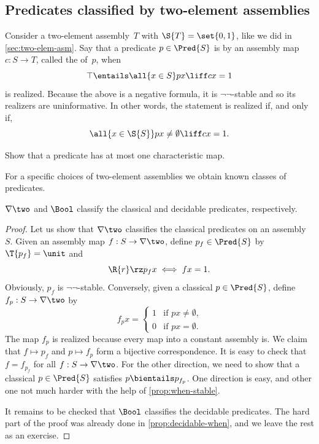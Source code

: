 \subsection{Predicates classified by two-element assemblies}
\label{sec:predicates-classified}

Consider a two-element assembly~$T$ with $\S{T} = \set{0,1}$, like we did in \cref{sec:two-elem-asm}. Say that a predicate $p \in \Pred{S}$ is  by an assembly map $c : S \to T$, called the  of~$p$, when
%
\begin{equation*}
  \top \entails \all{x \in S} p x \liff c x = 1
\end{equation*}
%
is realized. Because the above is a negative formula, it is $\neg\neg$-stable and so its realizers are uninformative. In other words, the statement is realized if, and only if,
%
\begin{equation*}
  \all{x \in \S{S}} p x \neq \emptyset \liff c x = 1.
\end{equation*}

\begin{exercise}
  Show that a predicate has at most one characteristic map.
\end{exercise}

For a specific choices of two-element assemblies we obtain known classes of predicates.

\begin{proposition}
  $\nabla \two$ and $\Bool$ classify the classical and decidable predicates, respectively.
\end{proposition}

\begin{proof}
  Let us show that $\nabla \two$ classifies the classical predicates on an assembly~$S$.
  Given an assembly map $f : S \to \nabla \two$, define $p_f \in \Pred{S}$ by $\T{p_f} = \unit$ and
  \begin{equation*}
    \R{r} \rz p_f x
    \iff
    f x = 1.
  \end{equation*}
  Obviously, $p_f$ is $\neg\neg$-stable. Conversely, given a classical $p \in \Pred{S}$, define $f_p : S \to \nabla \two$ by
  \begin{equation*}
    f_p x =
    \begin{cases}
      1 & \text{if $p x \neq \emptyset$,} \\
      0 & \text{if $p x = \emptyset$.}
    \end{cases}
  \end{equation*}
  The map $f_p$ is realized because every map into a constant assembly is.
  We claim that $f \mapsto p_f$ and $p \mapsto f_p$ form a bijective correspondence.
  It is easy to check that $f = f_{p_f}$ for all $f : S \to \nabla \two$.
  For the other direction, we need to show that a classical $p \in \Pred{S}$ satisfies $p \bientails p_{f_p}$. One direction is easy, and other one not much harder with the help of \cref{prop:when-stable}.

  It remains to be checked that $\Bool$ classifies the decidable predicates.
  The hard part of the proof was already done in \cref{prop:decidable-when}, and we leave the rest as an exercise.
\end{proof}

